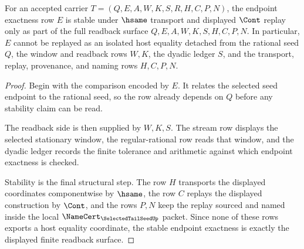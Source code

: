 \begin{theorem}
\label{thm:selected-tail-seed-endpoint-exactness-readback-stability}
For an accepted carrier $T=(Q,E,A,W,K,S,R,H,C,P,N)$, the endpoint exactness row $E$ is stable under $\hsame$ transport and displayed $\Cont$ replay only as part of the full readback surface $Q,E,A,W,K,S,H,C,P,N$. In particular, $E$ cannot be replayed as an isolated host equality detached from the rational seed $Q$, the window and readback rows $W,K$, the dyadic ledger $S$, and the transport, replay, provenance, and naming rows $H,C,P,N$.
\end{theorem}
\begin{proof}
Begin with the comparison encoded by $E$. It relates the selected seed endpoint to the rational seed, so the row already depends on $Q$ before any stability claim can be read.

The readback side is then supplied by $W,K,S$. The stream row displays the selected stationary window, the regular-rational row reads that window, and the dyadic ledger records the finite tolerance and arithmetic against which endpoint exactness is checked.

Stability is the final structural step. The row $H$ transports the displayed coordinates componentwise by $\hsame$, the row $C$ replays the displayed construction by $\Cont$, and the rows $P,N$ keep the replay sourced and named inside the local $\NameCert_{\SelectedTailSeedUp}$ packet. Since none of these rows exports a host equality coordinate, the stable endpoint exactness is exactly the displayed finite readback surface.
\end{proof}

